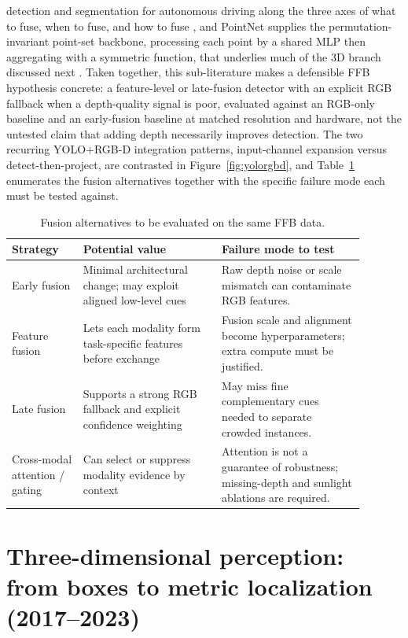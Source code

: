 detection and segmentation for autonomous driving along the three axes of what to fuse, when to fuse, and how to fuse \cite{feng2021multimodalsurvey}, and PointNet supplies the permutation-invariant point-set backbone, processing each point by a shared MLP then aggregating with a symmetric function, that underlies much of the 3D branch discussed next \cite{qi2017pointnet}. Taken together, this sub-literature makes a defensible FFB hypothesis concrete: a feature-level or late-fusion detector with an explicit RGB fallback when a depth-quality signal is poor, evaluated against an RGB-only baseline and an early-fusion baseline at matched resolution and hardware, not the untested claim that adding depth necessarily improves detection. The two recurring YOLO+RGB-D integration patterns, input-channel expansion versus detect-then-project, are contrasted in Figure~\ref{fig:yolorgbd}, and Table~\ref{tab:fusion} enumerates the fusion alternatives together with the specific failure mode each must be tested against.

\begin{table}[t]
\centering\small
\caption{Fusion alternatives to be evaluated on the same FFB data.}
\label{tab:fusion}
\begin{tabular}{p{0.18\linewidth}p{0.35\linewidth}p{0.36\linewidth}}
\toprule
Strategy & Potential value & Failure mode to test \\
\midrule
Early fusion & Minimal architectural change; may exploit aligned low-level cues & Raw depth noise or scale mismatch can contaminate RGB features. \\
Feature fusion & Lets each modality form task-specific features before exchange & Fusion scale and alignment become hyperparameters; extra compute must be justified. \\
Late fusion & Supports a strong RGB fallback and explicit confidence weighting & May miss fine complementary cues needed to separate crowded instances. \\
Cross-modal attention / gating & Can select or suppress modality evidence by context & Attention is not a guarantee of robustness; missing-depth and sunlight ablations are required. \\
\bottomrule
\end{tabular}
\end{table}

\section{Three-dimensional perception: from boxes to metric localization (2017--2023)}

